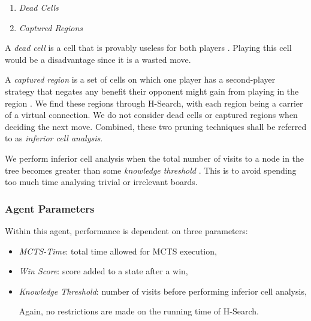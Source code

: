 \begin{enumerate}
    \item \textit{Dead Cells}
    \item \textit{Captured Regions}
\end{enumerate}

A \textit{dead cell} is a cell that is provably useless for both players \cite{MCTSHex}. Playing this cell would be a disadvantage since it is a wasted move.

A \textit{captured region} is a set of cells on
which one player has a second-player strategy that negates any benefit their opponent might gain from playing in the region \cite{MCTSHex}. We find these regions through H-Search, with each region being a carrier of a virtual connection.
We do not consider dead cells or captured regions when deciding the next move.
Combined, these two pruning techniques shall be referred to as \textit{inferior cell analysis}.

We perform inferior cell analysis when the total number of visits to a node in the tree becomes greater than some \textit{knowledge threshold} \cite{MCTSHex}. This is to avoid spending too much time analysing trivial or irrelevant boards.

\subsubsection{Agent Parameters}
Within this agent, performance is dependent on three parameters:

\begin{itemize}
    \item \textit{MCTS-Time}: total time allowed for MCTS execution,
    \item \textit{Win Score}: score added to a state after a win,
    \item \textit{Knowledge Threshold}: number of visits before performing inferior cell analysis,

Again, no restrictions are made on the running time of H-Search.
    
\end{itemize}
